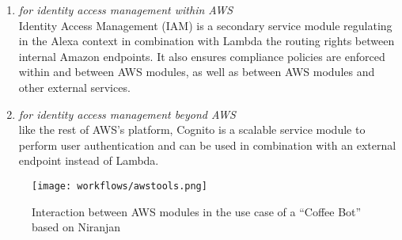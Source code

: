 \begin{enumerate}
	


	\item[\href{https://aws.amazon.com/iam/}{\textbf{IAM}} \footnote{\url{https://aws.amazon.com/iam}}]
	\textit{for identity access management within AWS}\\
	Identity Access Management (IAM) is a secondary service module regulating in the Alexa context in combination with Lambda the routing rights between internal Amazon endpoints. It also ensures compliance policies are enforced within and between AWS modules, as well as between AWS modules and other external services.
%	
%	


	\item[\href{https://aws.amazon.com/cognito/}{\textbf{Cognito}} \footnote{\url{https://aws.amazon.com/cognito}}]
	\textit{for identity access management beyond AWS}\\
	like the rest of AWS's platform, Cognito is a scalable service module to perform user authentication and can be used in combination with an external endpoint instead of Lambda.
	
	
\end{enumerate}


\begin{figure}[h!]
	\caption[Interaction Between AWS Modules (Coffee Bot)]{Interaction between AWS modules in the use case of a ``Coffee Bot'' based on Niranjan \cite{aws:lex_webinar} }\label{lex_interactionExample}
	\centering
	\texttt{[image: workflows/awstools.png]}
\end{figure}
%

